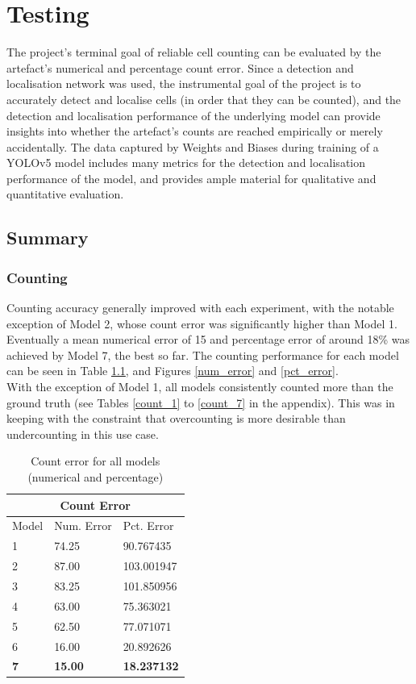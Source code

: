 
\chapter{Testing}
The project's terminal goal of reliable cell counting can be evaluated by the artefact's numerical and percentage count error. Since a detection and localisation network was used, the instrumental goal of the project is to accurately detect and localise cells (in order that they can be counted), and the detection and localisation performance of the underlying model can provide insights into whether the artefact's counts are reached empirically or merely accidentally. The data captured by Weights and Biases during training of a YOLOv5 model includes many metrics for the detection and localisation performance of the model, and provides ample material for qualitative and quantitative evaluation.

\section{Summary}
\subsection{Counting}
Counting accuracy generally improved with each experiment, with the notable exception of Model 2, whose count error was significantly higher than Model 1. Eventually a mean numerical error of 15 and percentage error of around 18\% was achieved by Model 7, the best so far. The counting performance for each model can be seen in Table \ref{count_error}, and Figures \ref{num_error} and \ref{pct_error}.\\

With the exception of Model 1, all models consistently counted more than the ground truth (see Tables \ref{count_1} to \ref{count_7} in the appendix). This was in keeping with the constraint that overcounting is more desirable than undercounting in this use case.\\

\begin{table}
\centering
\begin{tabular}{ |l||l|l|  }
\hline
\multicolumn{5}{|c|}{Count Error} \\
\hline
Model & Num. Error & Pct. Error \\
\hline
1 &      74.25 &   90.767435 \\
2 &      87.00 &  103.001947 \\
3 &      83.25 &  101.850956 \\
4 &      63.00 &   75.363021 \\
5 &      62.50 &   77.071071 \\
6 &      16.00 &   20.892626 \\
\textbf{7} &      \textbf{15.00} &   \textbf{18.237132}\\
\hline
\end{tabular}
\caption{Count error for all models (numerical and percentage)}
\label{count_error}
\end{table}

